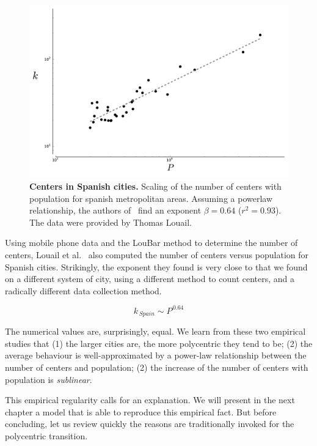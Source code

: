\begin{figure}
    \centering
    \includegraphics[width=\textwidth]{gfx/chapter-monocentric/spain_num-centers.pdf}
    \caption{{\bf Centers in Spanish cities.} Scaling of the number of centers with population for spanish
        metropolitan areas. Assuming a powerlaw relationship, the authors
    of~\cite{Louail:2014} find an exponent $\beta = 0.64$ ($r^2=0.93$). The data
were provided by Thomas Louail.\label{fig:centers_spain}}
\end{figure}

Using mobile phone data and the LouBar method to determine the number of
centers, Louail et al.~\cite{Louail:2014} also computed the number of centers
versus population for Spanish cities. Strikingly, the exponent they found is
very close to that we found on a different system of city, using a different
method to count centers, and a radically different data collection method.

\begin{equation}
    k_{\,Spain} \sim P^{\,0.64}
\end{equation}

The numerical values are, surprisingly, equal. We learn from these two empirical studies
that (1) the larger cities are, the more polycentric they tend to be; (2) the
average behaviour is well-approximated by a power-law relationship between the
number of centers and population; (2) the increase of the number of centers with
population is \emph{sublinear}.  

This empirical regularity calls for an explanation. We will present in the
next chapter a model that is able to reproduce this empirical fact. But before
concluding, let us review quickly the reasons are traditionally
invoked for the polycentric transition.

